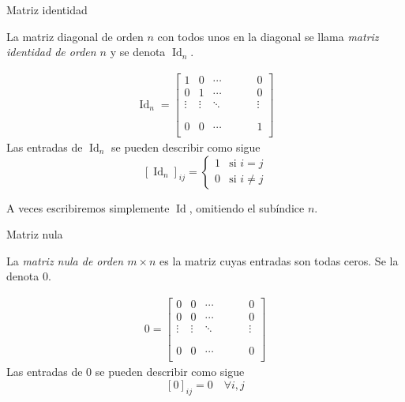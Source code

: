 \documentclass[handout]{beamer} %
\newcommand\Id{\operatorname{Id}}
\renewcommand{\_}[1]{_{\left[ #1 \right]}}
\renewcommand{\^}[1]{^{\left[ #1 \right]}}
\begin{document}
\begin{frame}{Matriz identidad}
    
    La matriz diagonal de orden $n$ con todos unos en la diagonal se llama \textit{matriz identidad de orden $n$} y se denota \textit{$\Id_n$}.\pause
    
    
    \begin{align*}
        \Id_n=
        \left[
        \begin{array}{ccccccc}
            1 & 0 & \cdots & & &  & 0\\ 
            0 & 1 & \cdots & & &  & 0\\
            \vdots & \vdots & \ddots & & &  & \vdots\\
            & &  & & &  \\
            & &  & & &  \\
            0 & 0 & \cdots & & & & 1\\ 
        \end{array}
        \right]
    \end{align*}
    \pause
    Las entradas de $\Id_n$ se pueden describir como sigue 
    $$
    [\Id_n]_{ij}=\begin{cases}
        1&\mbox{si $i=j$}\\ 
        0&\mbox{si $i\neq j$}
    \end{cases}
    $$
    
    A veces escribiremos simplemente \textit{$\Id$}, omitiendo el subíndice $n$.
\end{frame}

\begin{frame}{Matriz nula}
    
    La \textit{matriz nula de orden $m\times n$} es la matriz cuyas entradas son todas ceros. Se la denota \textit{$0$}.
    \pause
    
    \begin{align*}
        0=
        \left[
        \begin{array}{ccccccc}
            0 & 0 & \cdots & & &  & 0\\ 
            0 & 0 & \cdots & & &  & 0\\
            \vdots & \vdots & \ddots & & &  & \vdots\\
            & &  & & &  \\
            & &  & & &  \\
            0 & 0 & \cdots & & & & 0\\ 
        \end{array}
        \right]
    \end{align*}
    \pause
    Las entradas de $0$ se pueden describir como sigue 
    $$
    [0]_{ij}=0\quad\forall i,j
    $$
\end{frame}
\end{document}
